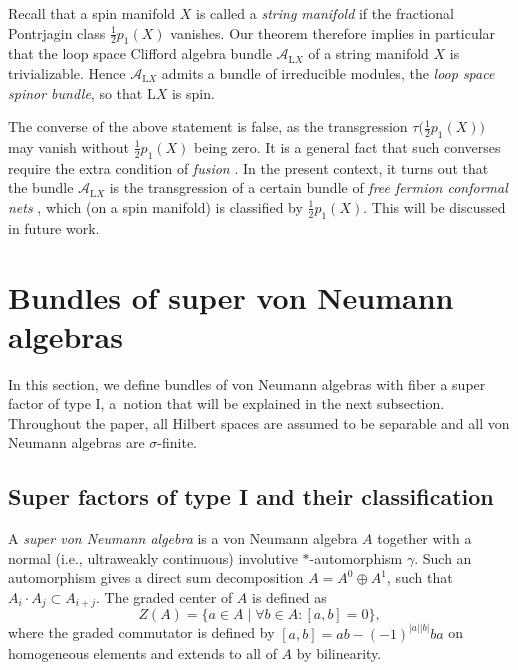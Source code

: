 \documentclass[11pt]{article}
\numberwithin{equation}{section}
\numberwithin{equation}{section}
\renewcommand{\L}{\mathrm{L}}
\begin{document}
Recall that a spin manifold $X$ is called a \emph{string manifold} if the fractional Pontrjagin class $\frac{1}{2}p_1(X)$ vanishes.
Our theorem therefore implies in particular that the loop space Clifford algebra bundle $\mathcal{A}_{\L X}$ of a string manifold $X$ is trivializable.
Hence $\mathcal{A}_{\L X}$ admits a bundle of irreducible modules, the \emph{loop space spinor bundle}, so that $\L X$ is spin.

The converse of the above statement is false, as the transgression $\tau\big(\frac{1}{2}p_1(X)\big)$ may vanish without $\frac{1}{2}p_1(X)$ being zero.
It is a general fact that such converses require the extra condition of \emph{fusion} \cite{WaldorfTransgressionI, WaldorfTransgressionII, WaldorfTransgressionIII}.
In the present context, it turns out that the bundle $\mathcal{A}_{\L X}$ is the transgression of a certain bundle of \emph{free fermion conformal nets} \cite{DouglasHenriquesModularFormsConformalNets}, which (on a spin manifold) is classified by $\frac{1}{2}p_1(X)$.
This will be discussed in future work.



\section{Bundles of super von Neumann algebras}

In this section, we define bundles of von Neumann algebras with fiber a super factor of type I, a~notion that will be explained in the next subsection.
Throughout the paper, all Hilbert spaces are assumed to be separable and all von Neumann algebras are $\sigma$-finite.

\subsection{Super factors of type I and their classification} \label{SectionSuperFactors}

A \emph{super von Neumann algebra} is a von Neumann algebra $A$ together with a normal (i.e., ultraweakly continuous) involutive $*$-automorphism $\gamma$.
Such an automorphism gives a direct sum decomposition $A = A^0 \oplus A^1$, such that $A_i \cdot A_j \subset A_{i+j}$.
The graded center of $A$ is defined as
\begin{equation*}
Z(A) = \{a \in A \mid \forall b \in A\colon  [a, b] = 0 \},
\end{equation*}
where the graded commutator is defined by $[a, b] = ab - (-1)^{|a||b|} ba$ on homogeneous elements and extends to all of $A$ by bilinearity.
\end{document}
